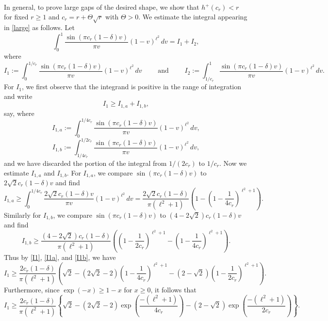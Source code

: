 \documentclass[oneside]{amsart}
\begin{document}
In general, to prove large gaps of the desired shape, we show that $h^+(c_r) < r$ for fixed $r\ge 1$ and $c_r = r + \Theta\sqrt{r}$ with $\Theta>0$. We estimate the integral appearing in \eqref{large} as follows. Let 
\[
\int_{0}^{1}\frac{\sin(\pi c_r(1-\delta) v)}{\pi v}(1-v)^{\ell^2}\,dv = I_1 + I_2,
\]
where
\[I_1:= \int_{0}^{1/c_r}\frac{\sin(\pi c_r(1-\delta) v)}{\pi v}(1-v)^{\ell^2}\,dv
\qquad \text{ and } \qquad
I_2:=\int_{1/c_r}^{1}\frac{\sin(\pi c_r(1-\delta) v)}{\pi v}(1-v)^{\ell^2}\,dv.
\]
For $I_1$, we first observe that the integrand is positive in the range of integration and write
\begin{equation}\label{I1}
I_1 \ge  I_{1,a} + I_{1,b},
\end{equation}
say, where
\[I_{1,a}:= \int_{0}^{1/4c_r}\frac{\sin(\pi c_r(1-\delta) v)}{\pi v}(1-v)^{\ell^2}\,dv,
\]
\[ I_{1,b}:= \int_{1/4c_r}^{1/2c_r}\frac{\sin(\pi c_r(1-\delta) v)}{\pi v}(1-v)^{\ell^2}\,dv,
\]
and we have discarded the portion of the integral from $1/(2c_r)$ to $1/c_r$. Now we estimate $I_{1,a}$ and $I_{1,b}$.
For $I_{1,a}$, we compare $\sin(\pi c_r(1-\delta) v)$ to $2\sqrt{2}c_r(1-\delta)v$ and find 
\begin{equation}\label{I1a}
I_{1,a} \ge \int_{0}^{1/4c_r}\frac{2\sqrt{2}c_r(1-\delta)v}{\pi v}(1-v)^{\ell^2}\,dv= \frac{2\sqrt{2}c_r(1-\delta)}{\pi(\ell^2+1)}\left(1- \left(1-\frac{1}{4c_r}\right)^{\ell^2+1}\right).
\end{equation}
Similarly for $I_{1,b}$, we compare $\sin(\pi c_r(1-\delta) v)$ to $(4-2\sqrt{2})c_r(1-\delta)v$ and find 
\begin{equation}\label{I1b}
I_{1,b} \ge \frac{(4-2\sqrt{2})c_r(1-\delta)}{\pi(\ell^2+1)}\left(\left(1-\frac{1}{2c_r}\right)^{\ell^2+1}- \left(1-\frac{1}{4c_r}\right)^{\ell^2+1}\right).
\end{equation}
Thus by \eqref{I1}, \eqref{I1a}, and \eqref{I1b}, we have
\[
I_1 \ge \frac{2c_r(1-\delta)}{\pi(\ell^2+1)}\left(\sqrt{2}- (2\sqrt{2}-2)\left(1-\frac{1}{4c_r}\right)^{\ell^2+1} -  (2-\sqrt{2})\left(1-\frac{1}{2c_r}\right)^{\ell^2+1}\right).
\]
Furthermore, since $\exp(-x)\ge 1-x$ for $x\ge0$, it follows that
\begin{equation}\label{I1estimate}
I_1  \ge \frac{2c_r(1-\delta)}{\pi(\ell^2+1)}\left\{\sqrt{2}- (2\sqrt{2}-2)\exp\left(\frac{-(\ell^2+1)}{4c_r} \right) -  (2-\sqrt{2})\exp\left(\frac{-(\ell^2+1)}{2c_r} \right)\right\}.
\end{equation}
\end{document}

